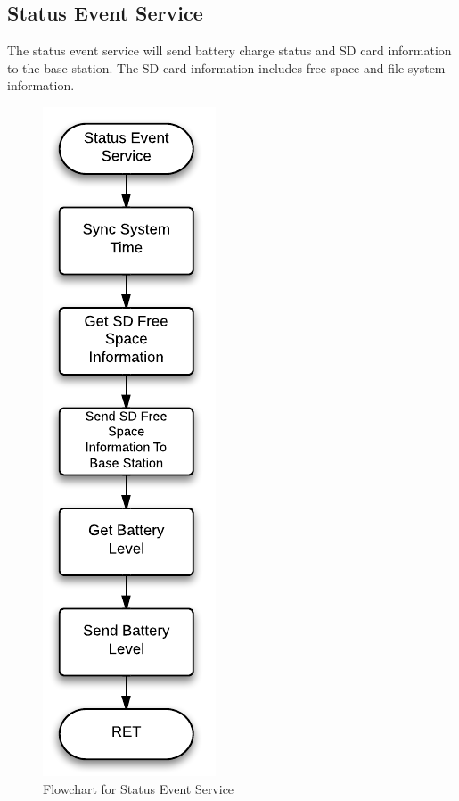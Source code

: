 \subsection{Status Event Service}
The status event service will send battery charge status and SD card information to the base station. The SD card information includes free space and file system information.
\begin{figure}[H]
	\centering
	\includegraphics[scale=1.0]{img/StatusEventService}
	\caption{Flowchart for Status Event Service \label{fig:statusMode}}
\end{figure}
